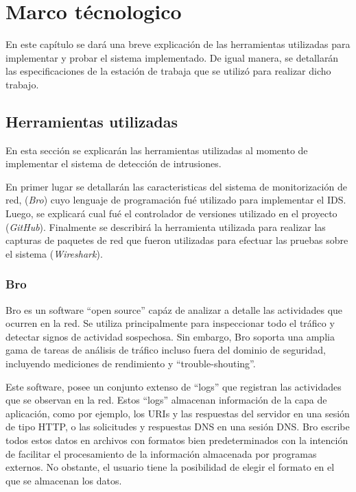 \chapter{Marco técnologico}
\label{capituloTecnologico}

En este capítulo se dará una breve explicación de las herramientas utilizadas para implementar y probar el sistema implementado. De igual manera, se detallarán las especificaciones de la estación de trabaja que se utilizó para realizar dicho trabajo.  

\section{Herramientas utilizadas}

En esta sección se explicarán las herramientas utilizadas al momento de implementar el sistema  de detección de intrusiones.

En primer lugar se detallarán las caracteristicas del sistema de monitorización de red, (\textit{Bro}) cuyo lenguaje de programación fué utilizado para implementar el IDS. Luego, se explicará cual fué el controlador de versiones utilizado en el proyecto (\textit{GitHub}). Finalmente se describirá la herramienta utilizada para realizar las capturas de paquetes de red que fueron utilizadas para efectuar las pruebas sobre el sistema (\textit{Wireshark}).  

\subsection{Bro}\label{ssec:Bro}

Bro es un software ``open source'' capáz de analizar a detalle las actividades que ocurren en la red. Se utiliza principalmente para inspeccionar todo el tráfico y detectar signos de actividad sospechosa. Sin embargo, Bro soporta una amplia gama de tareas de análisis de tráfico incluso fuera del dominio de seguridad, incluyendo mediciones de rendimiento y ``trouble-shouting''.\cite{Bro}

Este software, posee un conjunto extenso de ``logs'' que registran las actividades que se observan en la red. Estos ``logs'' almacenan información de la capa de aplicación, como por ejemplo, los URIs y las respuestas del servidor en una sesión de tipo HTTP, o las solicitudes y respuestas DNS en una sesión DNS. Bro escribe todos estos datos en archivos con formatos bien predeterminados con la intención de facilitar el procesamiento de la información almacenada por programas externos. No obstante, el usuario tiene la posibilidad de elegir el formato en el que se almacenan los datos.

